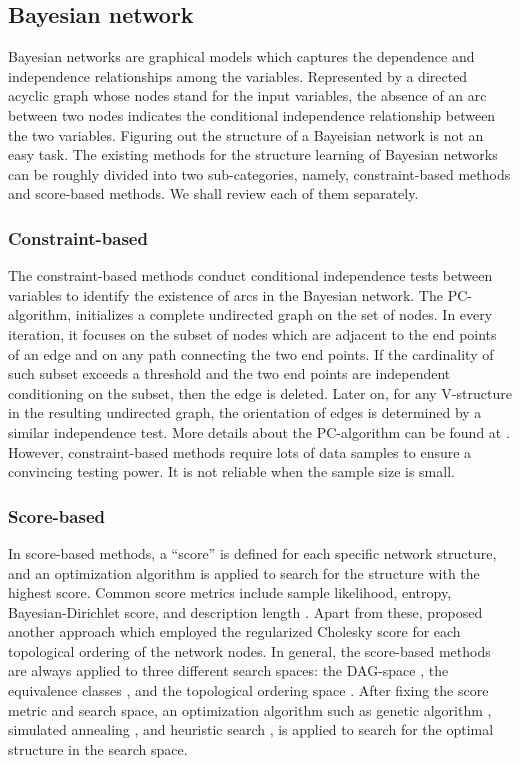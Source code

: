 \documentclass[twoside,11pt]{article}
\begin{document}
\subsection{Bayesian network}
Bayesian networks are graphical models which captures the dependence and independence relationships among the variables. Represented by a directed acyclic graph whose nodes stand for the input variables, the absence of an arc between two nodes indicates the conditional independence relationship between the two variables. Figuring out the structure of a Bayeisian network is not an easy task. The existing methods for the structure learning of Bayesian networks can be roughly divided into two sub-categories, namely, constraint-based methods and score-based methods. We shall review each of them separately.

\subsubsection{Constraint-based}
The constraint-based methods conduct conditional independence tests between variables to identify the existence of arcs in the Bayesian network. The PC-algorithm, initializes a complete undirected graph on the set of nodes. In every iteration, it focuses on the subset of nodes which are adjacent to the end points of an edge and on any path connecting the two end points. If the cardinality of such subset exceeds a threshold and the two end points are independent conditioning on the subset, then the edge is deleted. Later on, for any V-structure in the resulting undirected graph, the orientation of edges is determined by a similar independence test. More details about the PC-algorithm can be found at \citet{spirtes1991algorithm}. However, constraint-based methods require lots of data samples to ensure a convincing testing power. It is not reliable when the sample size is small.

\subsubsection{Score-based}
In score-based methods, a ``score'' is defined for each specific network structure, and an optimization algorithm is applied to search for the structure with the highest score. Common score metrics include sample likelihood, entropy, Bayesian-Dirichlet score, and description length \citep{cooper1992bayesian,heckerman1995learning,lam1993using,spiegelhalter1993bayesian}. Apart from these, \citet{ye2020optimizing} proposed another approach which employed the regularized Cholesky score for each topological ordering of the network nodes. In general, the score-based methods are always applied to three different search spaces: the DAG-space \citep{heckerman1995learning,gamez2011learning}, the equivalence classes \citep{heckerman1995learning,chickering2002optimal}, and the topological ordering space \citep{larranaga1996structure,teyssier2005ordering}. After fixing the score metric and search space, an optimization algorithm such as genetic algorithm \citep{larranaga1996structure}, simulated annealing \citep{ye2020optimizing}, and heuristic search \citep{lee2017metaheuristics}, is applied to search for the optimal structure in the search space. 
\end{document}
